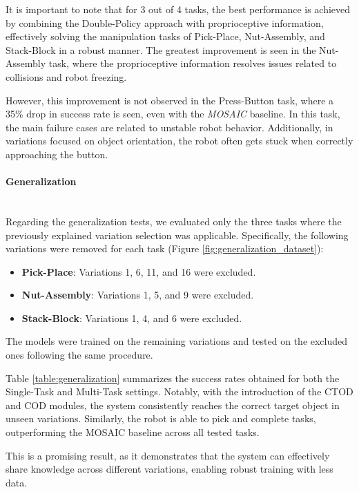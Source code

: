 It is important to note that for 3 out of 4 tasks, the best performance is achieved by combining the Double-Policy approach with proprioceptive information, effectively solving the manipulation tasks of Pick-Place, Nut-Assembly, and Stack-Block in a robust manner. The greatest improvement is seen in the Nut-Assembly task, where the proprioceptive information resolves issues related to collisions and robot freezing.

However, this improvement is not observed in the Press-Button task, where a 35\% drop in success rate is seen, even with the \textit{MOSAIC} baseline. In this task, the main failure cases are related to unstable robot behavior. Additionally, in variations focused on object orientation, the robot often gets stuck when correctly approaching the button.

\paragraph*{Generalization}\mbox{}\\
Regarding the generalization tests, we evaluated only the three tasks where the previously explained variation selection was applicable. Specifically, the following variations were removed for each task (Figure \ref{fig:generalization_dataset}):

\begin{itemize}
    \item \textbf{Pick-Place}: Variations 1, 6, 11, and 16 were excluded.
    \item \textbf{Nut-Assembly}: Variations 1, 5, and 9 were excluded.
    \item \textbf{Stack-Block}: Variations 1, 4, and 6 were excluded.
\end{itemize}

The models were trained on the remaining variations and tested on the excluded ones following the same procedure.

Table \ref{table:generalization} summarizes the success rates obtained for both the Single-Task and Multi-Task settings. Notably, with the introduction of the CTOD and COD modules, the system consistently reaches the correct target object in unseen variations. Similarly, the robot is able to pick and complete tasks, outperforming the MOSAIC baseline across all tested tasks.

This is a promising result, as it demonstrates that the system can effectively share knowledge across different variations, enabling robust training with less data.


